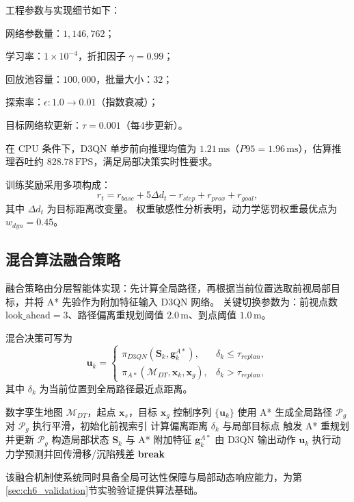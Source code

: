 工程参数与实现细节如下：
\begin{myitemize}
	\item 网络参数量：$1{,}146{,}762$；
	\item 学习率：$1\times10^{-4}$，折扣因子 $\gamma=0.99$；
	\item 回放池容量：$100{,}000$，批量大小：$32$；
	\item 探索率：$\epsilon:1.0\rightarrow0.01$（指数衰减）；
	\item 目标网络软更新：$\tau=0.001$（每4步更新）。
\end{myitemize}

在 CPU 条件下，D3QN 单步前向推理均值为 $1.21\,\mathrm{ms}$（$P95=1.96\,\mathrm{ms}$），估算推理吞吐约 $828.78\,\mathrm{FPS}$，满足局部决策实时性要求。

训练奖励采用多项构成：
\begin{equation}
r_t=r_{base}+5\Delta d_t-r_{step}+r_{prox}+r_{goal},
\label{eq:ch6_reward}
\end{equation}
其中 $\Delta d_t$ 为目标距离改变量。
权重敏感性分析表明，动力学惩罚权重最优点为 $w_{dyn}=0.45$。

\subsection{混合算法融合策略}
\label{subsec:ch6_fusion}

融合策略由分层智能体实现：先计算全局路径，再根据当前位置选取前视局部目标，并将 A* 先验作为附加特征输入 D3QN 网络。
关键切换参数为：前视点数 $\mathrm{look\_ahead}=3$、路径偏离重规划阈值 $2.0\,\mathrm{m}$、到点阈值 $1.0\,\mathrm{m}$。

混合决策可写为
\begin{equation}
\mathbf{u}_k=
\begin{cases}
\pi_{D3QN}\!\left(\mathbf{S}_k,\mathbf{g}^{A*}_k\right), & \delta_k\le \tau_{replan},\\
\pi_{A*}\!\left(\mathcal{M}_{DT},\mathbf{x}_k,\mathbf{x}_g\right), & \delta_k> \tau_{replan},
\end{cases}
\label{eq:ch6_switch}
\end{equation}
其中 $\delta_k$ 为当前位置到全局路径最近点距离。

\begin{algorithm}[H]
\caption{A-D3QN 混合路径规划}
\label{alg:ch6_ad3qn}
\begin{algorithmic}[1]
\REQUIRE 数字孪生地图 $\mathcal{M}_{DT}$，起点 $\mathbf{x}_s$，目标 $\mathbf{x}_g$
\ENSURE 控制序列 $\{\mathbf{u}_k\}$
\STATE 使用 A* 生成全局路径 $\mathcal{P}_g$
\STATE 对 $\mathcal{P}_g$ 执行平滑，初始化前视索引
\STATE 计算偏离距离 $\delta_k$ 与局部目标点
\STATE 触发 A* 重规划并更新 $\mathcal{P}_g$
\ENDIF
\STATE 构造局部状态 $\mathbf{S}_k$ 与 A* 附加特征 $\mathbf{g}^{A*}_k$
\STATE 由 D3QN 输出动作 $\mathbf{u}_k$
\STATE 执行动力学预测并回传滑移/沉陷残差
\STATE \textbf{break}
\ENDIF
\ENDFOR
\end{algorithmic}
\end{algorithm}

该融合机制使系统同时具备全局可达性保障与局部动态响应能力，为第\ref{sec:ch6_validation}节实验验证提供算法基础。
